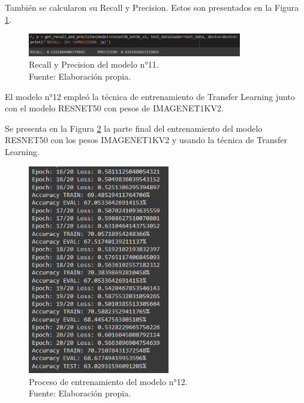 También se calcularon su Recall y Precision. Estos son presentados en la Figura \ref{4:fig141}.

\begin{figure}[H]
	\begin{center}
		\includegraphics[width=0.83\textwidth]{4/figures/model11_rp.PNG}
		\caption[Recall y Precision del modelo n°11]{Recall y Precision del modelo n°11. \\
		Fuente: Elaboración propia.}
		\label{4:fig141}
	\end{center}
\end{figure}

El modelo n°12 empleó la técnica de entrenamiento de Transfer Learning junto con el modelo RESNET50 con pesos de IMAGENET1KV2.

Se presenta en la Figura \ref{4:fig142} la parte final del entrenamiento del modelo RESNET50 con los pesos IMAGENET1KV2 y usando la técnica de Transfer Learning.

\begin{figure}[H]
	\begin{center}
		\includegraphics[width=0.55\textwidth]{4/figures/model12_train.PNG}
		\caption[Proceso de entrenamiento del modelo n°12]{Proceso de entrenamiento del modelo n°12. \\
		Fuente: Elaboración propia.}
		\label{4:fig142}
	\end{center}
\end{figure}

